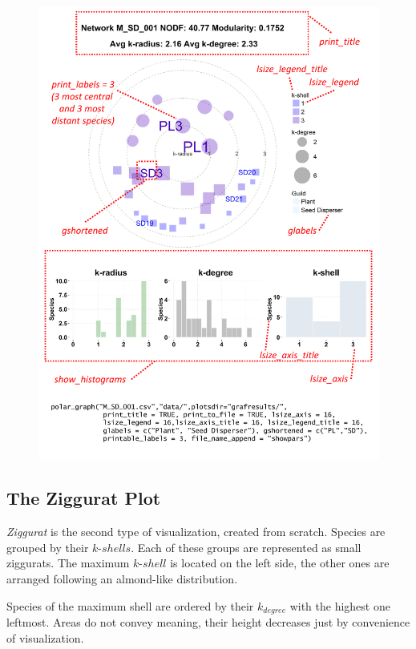 \documentclass[12pt]{article}
\begin{document}
\clearpage
\begin{figure}[ht!]
\centering
\includegraphics[scale=0.75]{polar_params.pdf}
\label{fig:KMAN_polar_params}
\end{figure}

\clearpage

\subsection*{The Ziggurat Plot}
\label{polar_plot}

\textit{Ziggurat} is the second type of visualization, created from scratch. Species are grouped by their $k$-$shells$. Each of these groups are represented as small ziggurats. The maximum $k$-$shell$ is located on the left side, the other ones are arranged following an almond-like distribution. 

Species of the maximum shell are ordered by their $k_{degree}$ with the highest one leftmost. Areas do not convey meaning, their height decreases just by convenience of visualization. 
\end{document}
